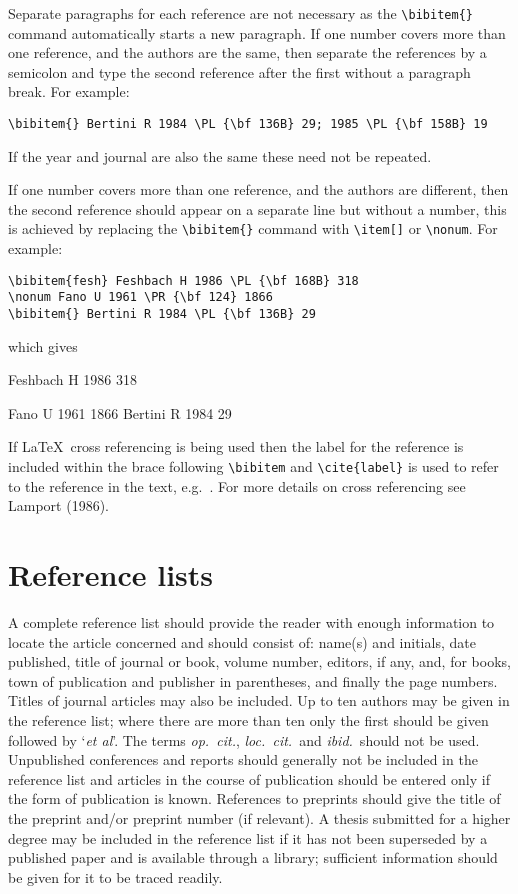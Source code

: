 Separate paragraphs for each reference are not necessary as the
\verb"\bibitem{}" 
command automatically starts a new paragraph.
If one number covers more than one reference, and the authors are the 
same, then separate the references by a semicolon and type the second 
reference after the first without a paragraph break. For example:
\begin{verbatim}
\bibitem{} Bertini R 1984 \PL {\bf 136B} 29; 1985 \PL {\bf 158B} 19
\end{verbatim}
If the year and journal are also the same these need not be 
repeated.


If one number covers more than one reference, and the 
authors are different, then the second reference should appear
on a separate line but without a number, this is achieved by replacing the 
\verb"\bibitem{}" command with \verb"\item[]" or \verb"\nonum". 
For example:
\begin{verbatim}
\bibitem{fesh} Feshbach H 1986 \PL {\bf 168B} 318
\nonum Fano U 1961 \PR {\bf 124} 1866
\bibitem{} Bertini R 1984 \PL {\bf 136B} 29
\end{verbatim}
which gives
\begin{thebibliography}{9}
 Feshbach H 1986  318
\item[] Fano U 1961  1866
\bibitem{} Bertini R 1984  29
\end{thebibliography}

If \LaTeX\ cross referencing
is being used then the label for the 
reference is included within the brace following \verb"\bibitem"
and \verb"\cite{label}" is used to refer to the reference in the 
text, e.g.\ \cite{fesh}. For more details on cross referencing see Lamport 
(1986).



\section{Reference lists}
A complete reference list should provide the reader with enough information 
to locate the article concerned and should consist of: name(s) and 
initials, date published, title of journal or book, volume number, 
editors, if any, and, for books, town of publication and publisher in 
parentheses, and finally the page numbers. Titles of journal articles may 
also be included. Up to ten authors may be given in the reference 
list; where there are more than ten only the first should be given 
followed by `{\it et al}'. The terms {\it op.\ cit.}, {\it loc.\ cit.}\ 
and {\it ibid.}\ should not be used. Unpublished conferences and 
reports should generally not be included in the reference list and 
articles in the course of publication should be entered only if the 
form of publication is known. References to preprints should give 
the title of the preprint and/or preprint number (if relevant). A 
thesis submitted for a higher degree may be included in the reference 
list if it has not been superseded by a published paper and is 
available through a library; sufficient information should be given 
for it to be traced readily.  





